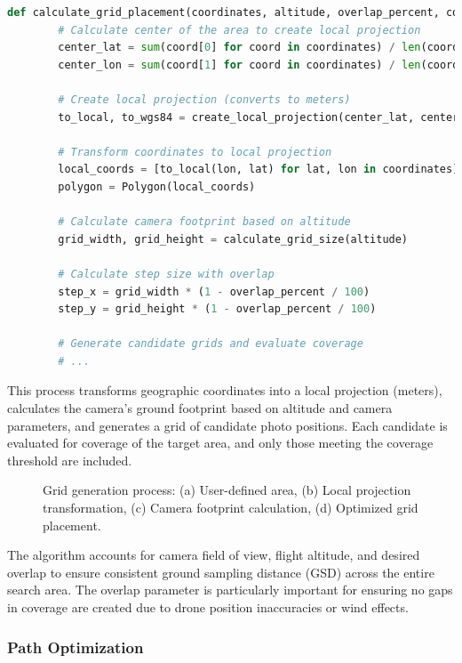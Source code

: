     \begin{lstlisting}[language=Python]
    def calculate_grid_placement(coordinates, altitude, overlap_percent, coverage):
        # Calculate center of the area to create local projection
        center_lat = sum(coord[0] for coord in coordinates) / len(coordinates)
        center_lon = sum(coord[1] for coord in coordinates) / len(coordinates)
        
        # Create local projection (converts to meters)
        to_local, to_wgs84 = create_local_projection(center_lat, center_lon)
        
        # Transform coordinates to local projection
        local_coords = [to_local(lon, lat) for lat, lon in coordinates]
        polygon = Polygon(local_coords)
        
        # Calculate camera footprint based on altitude
        grid_width, grid_height = calculate_grid_size(altitude)
        
        # Calculate step size with overlap
        step_x = grid_width * (1 - overlap_percent / 100)
        step_y = grid_height * (1 - overlap_percent / 100)
        
        # Generate candidate grids and evaluate coverage
        # ...
    \end{lstlisting}
    
    This process transforms geographic coordinates into a local projection (meters), calculates the camera's ground footprint based on altitude and camera parameters, and generates a grid of candidate photo positions. Each candidate is evaluated for coverage of the target area, and only those meeting the coverage threshold are included.
    
    \begin{figure}[H]
        \centering
        \caption{Grid generation process: (a) User-defined area, (b) Local projection transformation, (c) Camera footprint calculation, (d) Optimized grid placement.}
        \label{fig:grid-generation}
    \end{figure}
    
    The algorithm accounts for camera field of view, flight altitude, and desired overlap to ensure consistent ground sampling distance (GSD) across the entire search area. The overlap parameter is particularly important for ensuring no gaps in coverage are created due to drone position inaccuracies or wind effects.
    
    \subsubsection{Path Optimization}
    
